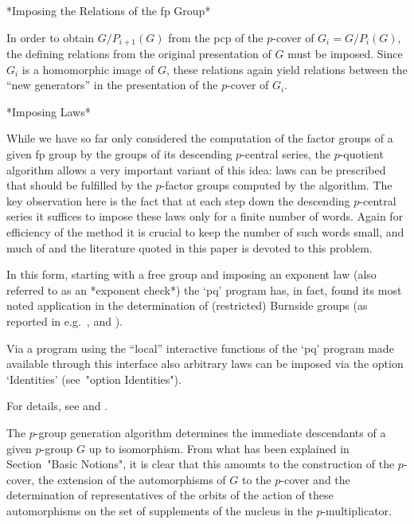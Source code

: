 \goodbreak%
*Imposing the Relations of the fp Group*

In order to obtain $G/P_{i+1}(G)$ from the pcp  of  the  $p$-cover  of
$G_i  =  G/P_i(G)$,  the  defining   relations   from   the   original
presentation of $G$ must be imposed.  Since  $G_i$  is  a  homomorphic
image of $G$, these relations again yield relations between the  ``new
generators'' in the presentation of the $p$-cover of $G_i$.

*Imposing Laws*

While we have so far only considered the  computation  of  the  factor
groups of a given fp group by the groups of its descending $p$-central
series, the $p$-quotient algorithm allows a very important variant  of
this idea: laws can be prescribed that  should  be  fulfilled  by  the
$p$-factor groups computed by the algorithm. The key observation  here
is the fact that at each step down the descending  $p$-central  series
it suffices to impose these laws only for a finite  number  of  words.
Again for efficiency of the method it is crucial to keep the number of
such words small, and much of \cite{NO96} and the literature quoted in
this paper is devoted to this problem.

In this form, starting with a free group and imposing an exponent  law
(also referred to as an *exponent check*) the  `pq'  program  has,  in
fact, found  its  most  noted  application  in  the  determination  of
(restricted)  Burnside  groups  (as  reported   in   e.g.~\cite{HN80},
\cite{NO96} and \cite{VL90b}).

Via a {\GAP} program using the ``local'' interactive functions of  the
`pq' program made available through this interface also arbitrary laws
can be imposed via the option `Identities' (see~"option Identities").


For details, see \cite{New77} and \cite{OBr90}.

The  $p$-group   generation   algorithm   determines   the   immediate
descendants of a given $p$-group $G$ up to isomorphism. From what  has
been explained in Section~"Basic  Notions",  it  is  clear  that  this
amounts to the construction of the $p$-cover,  the  extension  of  the
automorphisms of  $G$  to  the  $p$-cover  and  the  determination  of
representatives of the orbits of the action of these automorphisms  on
the set of supplements of the nucleus in the $p$-multiplicator.


